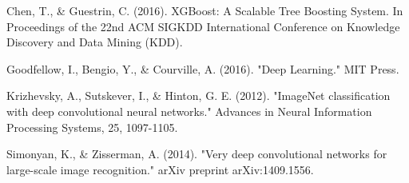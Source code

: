 \documentclass[sn-mathphys-num]{sn-jnl}%
\theoremstyle{thmstyleone}%
\theoremstyle{thmstyletwo}%
\theoremstyle{thmstylethree}%
\begin{document}
\noindent Chen, T., & Guestrin, C. (2016). XGBoost: A Scalable Tree Boosting System. In Proceedings of the 22nd ACM SIGKDD International Conference on Knowledge Discovery and Data Mining (KDD).

\vspace{1em}

\noindent  Goodfellow, I., Bengio, Y., & Courville, A. (2016). "Deep Learning." MIT Press.

\vspace{1em}

\noindent Krizhevsky, A., Sutskever, I., & Hinton, G. E. (2012). "ImageNet classification with deep convolutional neural networks." Advances in Neural Information Processing Systems, 25, 1097-1105.

\vspace{1em}

\noindent Simonyan, K., & Zisserman, A. (2014). "Very deep convolutional networks for large-scale image recognition." arXiv preprint arXiv:1409.1556.
\end{document}
